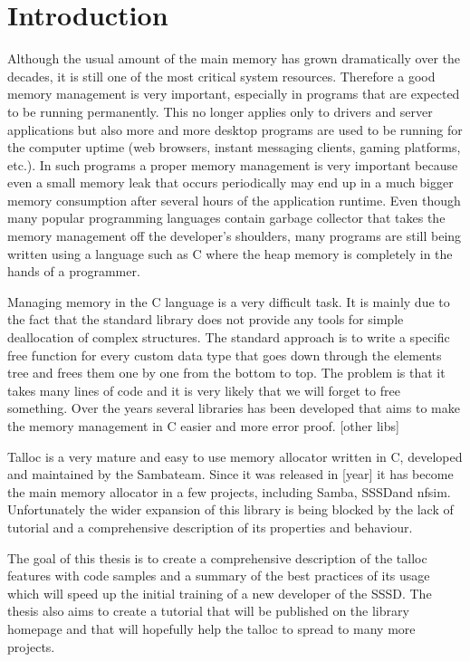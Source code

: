 \chapter{Introduction}

Although the usual amount of the main memory has grown dramatically over the
decades, it is still one of the most critical system resources. Therefore a good
memory management is very important, especially in programs that are expected to
be running permanently. This no longer applies only to drivers and server
applications but also more and more desktop programs are used to be running
for the computer uptime (web browsers, instant messaging clients, gaming
platforms, etc.). In such programs a proper memory management is very important
because even a small memory leak that occurs periodically may end up in a much
bigger memory consumption after several hours of the application runtime. Even
though many popular programming languages contain garbage collector that takes
the memory management off the developer's shoulders, many programs are still
being written using a language such as C where the heap memory is completely
in the hands of a programmer.

Managing memory in the C language is a very difficult task. It is mainly due to
the fact that the standard library does not provide any tools for simple
deallocation of complex structures. The standard approach is to write a
specific free function for every custom data type that goes down through the
elements tree and frees them one by one from the bottom to top. The problem is
that it takes many lines of code and it is very likely that we will forget to
free something. Over the years several libraries has been developed that aims
to make the memory management in C easier and more error proof. [other libs]

Talloc is a very mature and easy to use memory allocator written in C, developed
and maintained by the Samba\footnotemark[1] team. Since it was released in
[year] it has become the main memory allocator in a few projects, including Samba,
SSSD\footnotemark[2] and nfsim\footnotemark[3]. Unfortunately the wider
expansion of this library is being blocked by the lack of tutorial and a
comprehensive description of its properties and behaviour.

The goal of this thesis is to create a comprehensive description of the talloc
features with code samples and a summary of the best practices of its usage
which will speed up the initial training of a new developer of the SSSD. The
thesis also aims to create a tutorial that will be published on the library
homepage and that will hopefully help the talloc to spread to many more projects.

